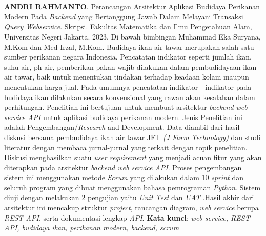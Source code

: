 \chapter*{}

\begin{spacing}{1}
\textbf{ANDRI RAHMANTO}. Perancangan Arsitektur Aplikasi Budidaya Perikanan Modern Pada \textit{Backend} yang Bertanggung Jawab Dalam Melayani Transaksi \textit{Query Webservice}. Skripsi. Fakultas Matematika dan Ilmu Pengetahuan Alam, Universitas Negeri Jakarta. 2023. Di bawah bimbingan Muhammad Eka Suryana, M.Kom dan Med Irzal, M.Kom.
\newline
\newline
Budidaya ikan air tawar merupakan salah satu sumber perikanan negara Indonesia. Pencatatan indikator seperti jumlah ikan, suhu air, ph air, pemberikan pakan wajib dilakukan dalam pembudidayaan ikan air tawar, baik untuk menentukan tindakan terhadap keadaan kolam maupun menentukan harga jual. Pada umumnya pencatatan indikator - indikator pada budidaya ikan dilakukan secara konvensional yang rawan akan kesalahan dalam perhitungan. Penelitian ini bertujuan untuk membuat arsitektur \textit{backend web service API} untuk aplikasi budidaya perikanan modern. Jenis Penelitian ini adalah Pengembangan/\textit{Research} and Development. Data diambil dari hasil diskusi bersama pembudidaya ikan air tawar JFT \textit{(J Farm Technology)} dan studi literatur dengan membaca jurnal-jurnal yang terkait dengan topik penelitian. Diskusi menghasilkan suatu \textit{user requirement} yang menjadi acuan fitur yang akan diterapkan pada arsitektur \textit{backend web service API}. Proses pengembangan sistem ini menggunakan metode \textit{Scrum} yang dilakukan dalam 10 \textit{sprint} dan seluruh program yang dibuat menggunakan bahasa pemrograman \textit{Python}. Sistem diuji dengan melakukan 2 pengujian yaitu \textit{Unit Test} dan \textit{UAT} .Hasil akhir dari arsitektur ini mencakup struktur \textit{project}, rancangan diagram, \textit{web service} berupa \textit{REST API}, serta dokumentasi lengkap \textit{API}.
\newline
\newline
\noindent \textbf{Kata kunci}: \textit{web service, REST API, budidaya ikan, perikanan modern, backend, scrum}
\end{spacing}